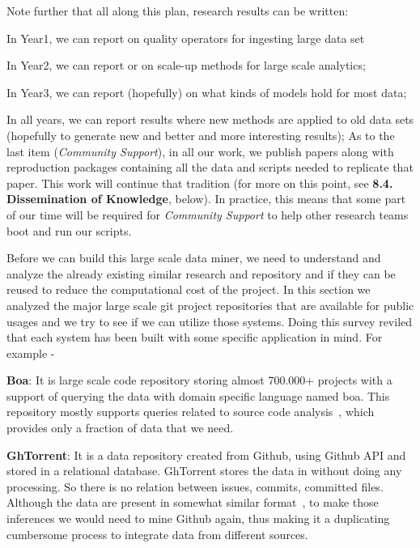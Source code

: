 Note further that all along this plan, research results can be written:
\bi
\item In Year1, we can report on quality operators for ingesting large data set
\item In Year2, we can report or on scale-up methods for large scale analytics;
\item In Year3, we can report (hopefully) on what kinds of models hold for most data;
\item In all years, we can report results where new methods are applied to old data sets (hopefully to generate new and better and more interesting results); 
\ei
As to the  last item ({\em Community Support}), 
in all our work, we  publish papers along with reproduction packages containing all the data and scripts needed to replicate
that paper. This work will continue that tradition (for more on this point, see {\bf 8.4. Dissemination of Knowledge}, below).
  In practice, this means that some part of our time will be required for {\em Community Support} to help other research teams boot and run our scripts.

 



Before we can build this large scale data miner, we need to understand and analyze the already existing similar research and repository and if they can be reused to reduce the computational cost of the project. In this section we analyzed the major large scale git project repositories that are available for public usages and we try to see if we can utilize those systems. Doing this survey reviled that each system has been built with some specific application in mind. For example -  


\textbf{Boa}: It is large scale code repository storing almost 700.000+ projects with a support of querying the data with domain specific language named boa. This repository mostly supports queries related to source code analysis~\cite{dyer2013boa, upadhyaya2018collective, dyer2014declarative, dyer2014mining, sherman2018structurally, xavier2017historical, diamantopoulos2016qualboa}, which provides only a fraction of data that we need.

\textbf{GhTorrent}: It is a data repository created from Github, using Github API and stored in a relational database. GhTorrent stores the data in without doing any processing. So there is no relation between issues, commits, committed files. Although the data are present in somewhat similar format~\cite{cabot2015exploring, izquierdo2015gila, yu2014reviewer, gousios2015work, gousios2014dataset}, to make those inferences we would need to mine Github again, thus making it a duplicating cumbersome process to integrate data from different sources.


